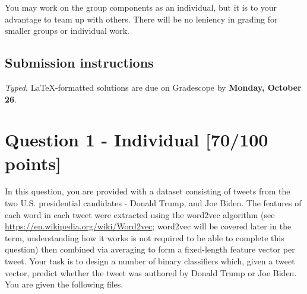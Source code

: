 You may work on the group components as an individual, but it is to your advantage to team up with others. There will be no leniency in grading for smaller groups or individual work. \\

\subsection*{Submission instructions}
\textit{Typed}, \LaTeX-formatted solutions are due on Gradescope by \textbf{Monday, October 26}.

\section*{Question 1 - Individual \hspace{7.0cm}[70/100 points]}

In this question, you are provided with a dataset consisting of tweets from the two U.S. presidential candidates - Donald Trump, and Joe Biden. The features of each word in each tweet were extracted using the word2vec algorithm (see \url{https://en.wikipedia.org/wiki/Word2vec}; word2vec will be covered later in the term, understanding how it works is not required to be able to complete this question) then combined via averaging to form a fixed-length feature vector per tweet. Your task is to design a number of binary classifiers which, given a tweet vector, predict whether the tweet was authored by  Donald Trump or Joe Biden. You are given the following files.

